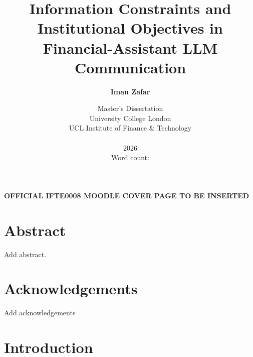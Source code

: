 \documentclass[12pt,a4paper,oneside]{report}
\title{Information Constraints and Institutional Objectives in Financial-Assistant LLM Communication}
\author{\textbf{Iman Zafar}}
\date{Master's Dissertation\\[2em]
University College London\\
UCL Institute of Finance \& Technology\\
\rev{MSc Banking and Digital Finance}\\[1em]
2026\\[0.5em]
Word count: \rev{9,751}}
\newcommand{\rev}[1]{#1}
\newenvironment{revisionblock}{}{}
\begin{document}
\hypersetup{pageanchor=false}
\begin{titlepage}
\thispagestyle{empty}
\centering
\vspace*{0.28\textheight}
{\Large\bfseries\rev{OFFICIAL IFTE0008 MOODLE COVER PAGE TO BE INSERTED}\par}
\vspace{1.5cm}
\end{titlepage}

\maketitle

\hypersetup{pageanchor=true}
\chapter*{\rev{Abstract}}
\begin{revisionblock}
Add abstract.
\end{revisionblock}

\chapter*{\rev{Acknowledgements}}
\begin{revisionblock}
Add acknowledgements
\end{revisionblock}

\tableofcontents
\clearpage


\chapter[Introduction]{\rev{Introduction}}
\label{chap:introduction}
\end{document}

